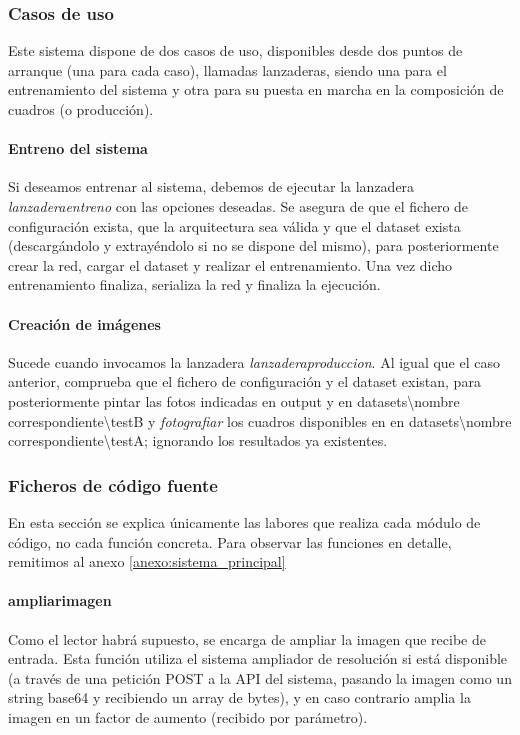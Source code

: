 \documentclass[../main.tex]{subfiles}
\begin{document}
\subsubsection{Casos de uso}
Este sistema dispone de dos casos de uso, disponibles desde dos puntos de arranque (una para cada caso), llamadas lanzaderas, siendo una para el entrenamiento del sistema y otra para su puesta en marcha en la composición de cuadros (o producción).
    \paragraph{Entreno del sistema}
    \label{seccion:entreno_sistema_cgan}
    Si deseamos entrenar al sistema, debemos de ejecutar la lanzadera \textit{lanzadera\textunderscore entreno} con las opciones deseadas. Se asegura de que el fichero de configuración exista, que la arquitectura sea válida y que el dataset exista (descargándolo y extrayéndolo si no se dispone del mismo), para posteriormente crear la red, cargar el dataset y realizar el entrenamiento. Una vez dicho entrenamiento finaliza, serializa la red y finaliza la ejecución.
    \paragraph{Creación de imágenes}
    \label{seccion:creacion_imagenes}
    Sucede cuando invocamos la lanzadera \textit{lanzadera\textunderscore produccion}. Al igual que el caso anterior, comprueba que el fichero de configuración y el dataset existan, para posteriormente pintar las fotos indicadas en output y en datasets\textbackslash nombre correspondiente\textbackslash testB y \textit{fotografiar} los cuadros disponibles en en datasets\textbackslash nombre correspondiente\textbackslash testA; ignorando los resultados ya existentes.

\subsubsection{Ficheros de código fuente}
En esta sección se explica únicamente las labores que realiza cada módulo de código, no cada función concreta. Para observar las funciones en detalle, remitimos al anexo \ref{anexo:sistema_principal}

    \paragraph{ampliar\textunderscore imagen}
    Como el lector habrá supuesto, se encarga de ampliar la imagen que recibe de entrada. Esta función utiliza el sistema ampliador de resolución si está disponible (a través de una petición POST a la API del sistema, pasando la imagen como un string base64 y recibiendo un array de bytes), y en caso contrario amplia la imagen en un factor de aumento (recibido por parámetro).
    
\end{document}
